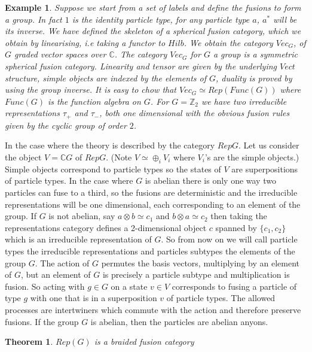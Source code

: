 \documentclass{article}
\newtheorem{example}{Example}
\newtheorem{theorem}{Theorem}
\newenvironment{remark}[1][Remark]{\begin{trivlist}
\item[\hskip \labelsep {\bfseries #1}]}{\end{trivlist}}
\begin{document}
\begin{example}
	Suppose we start from a set of labels and define the fusions to form a group. In fact $1$ is the identity particle type, for any particle type $a$, $a^*$ will be its inverse. We have defined the skeleton of a spherical fusion category, which we obtain by linearising, i.e taking a functor to $Hilb$. We obtain the category $Vec_G$, of $G$ graded vector spaces over $\mathbb{C}$.
	The category $Vec_G$ for $G$ a group is a symmetric spherical fusion category. Linearity and tensor are given by the underlying $Vect$ structure, simple objects are indexed by the elements of $G$, duality is proved by using the group inverse. It is easy to chow that $Vec_G \simeq Rep(Func(G))$ where $Func(G)$ is the function algebra on $G$.
	For $G=\mathbb{Z}_2$ we have two irreducible representations $\tau_+$ and $\tau_-$, both one dimensional with the obvious fusion rules given by the cyclic group of order $2$.\\
\end{example}
\begin{remark}
	In the case where the theory is described by the category $RepG$.
	Let us consider the object $V=\mathbb{C}G$ of $RepG$. (Note $V \simeq \oplus_i V_i$ where $V_i$'s are the simple objects.) Simple objects correspond to particle types so the states of $V$ are superpositions of particle types. In the case where $G$ is abelian there is only one way two particles can fuse to a third, so the fusions are deterministic and the irreducible representations will be one dimensional, each corresponding to an element of the group. If $G$ is not abelian, say $a\otimes b \simeq c_1$ and $b \otimes a \simeq c_2$ then taking the representations category defines a 2-dimensional object $c$ spanned by $\{c_1,c_2\}$ which is an irreducible representation of $G$. So from now on we will call particle types the irreducible representations and particles subtypes the elements of the group $G$.  The action of $G$ permutes the basis vectors, multiplying by an element of $G$, but an element of $G$ is precisely a particle subtype and multiplication is fusion. So acting with $g \in G$ on a state $v \in V$ corresponds to fusing a particle of type $g$ with one that is in a superposition $v$ of particle types. The allowed processes are intertwiners which commute with the action and therefore preserve fusions. If the group $G$ is abelian, then the particles are abelian anyons.
\end{remark}

\begin{theorem} 
	$Rep(G)$ is a braided fusion category
\end{theorem}
\end{document}
